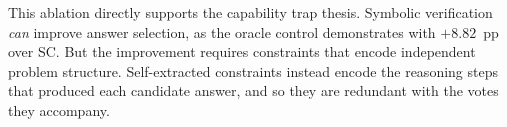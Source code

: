 This ablation directly supports the capability trap thesis. Symbolic verification \emph{can} improve answer selection, as the oracle control demonstrates with $+8.82$~pp over SC. But the improvement requires constraints that encode independent problem structure. Self-extracted constraints instead encode the reasoning steps that produced each candidate answer, and so they are redundant with the votes they accompany.
